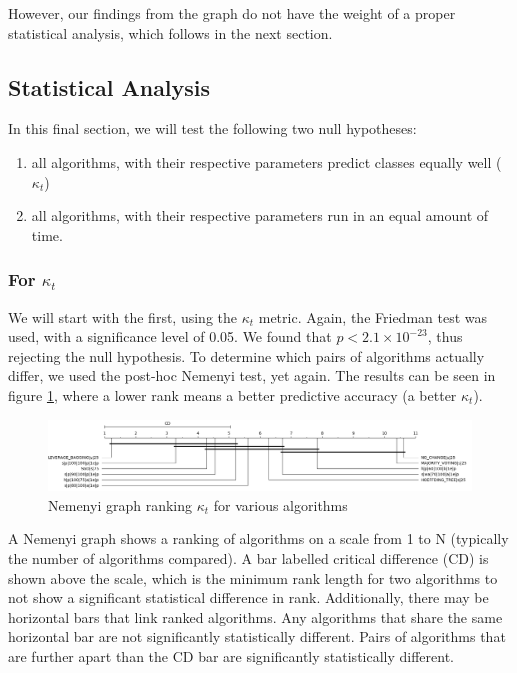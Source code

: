 However, our findings from the graph do not have the weight of a proper statistical analysis, which follows in the next section.

\subsection{Statistical Analysis}
In this final section, we will test the following two null hypotheses:
\begin{enumerate}
\item all algorithms, with their respective parameters predict classes equally well ($\kappa_t$)
\item all algorithms, with their respective parameters run in an equal amount of time.
\end{enumerate}

\subsubsection{For $\kappa_t$}

We will start with the first, using the $\kappa_t$ metric. Again, the Friedman test was used, with a significance level of 0.05. We found that $p < 2.1\times10^{-23}$, thus rejecting the null hypothesis.
To determine which pairs of algorithms actually differ, we used the post-hoc Nemenyi test, yet again. The results can be seen in figure \ref{fig:sota_compare_all_kappa_nemenyi}, where a lower rank means a better predictive accuracy (a better $\kappa_t$).

\begin{figure}
  \includegraphics[width=\linewidth]{./images/chapter5/sota_compare_all_kappa_nemenyi}
\caption{\label{fig:sota_compare_all_kappa_nemenyi}Nemenyi graph ranking $\kappa_t$ for various algorithms}
\end{figure}

A Nemenyi graph shows a ranking of algorithms on a scale from 1 to N (typically the number of algorithms compared). A bar labelled critical difference (CD) is shown above the scale, which is the minimum rank length for two algorithms to not show a significant statistical difference in rank. 
Additionally, there may be horizontal bars that link ranked algorithms. Any algorithms that share the same horizontal bar are not significantly statistically different. Pairs of algorithms that are further apart than the CD bar are significantly statistically different.


